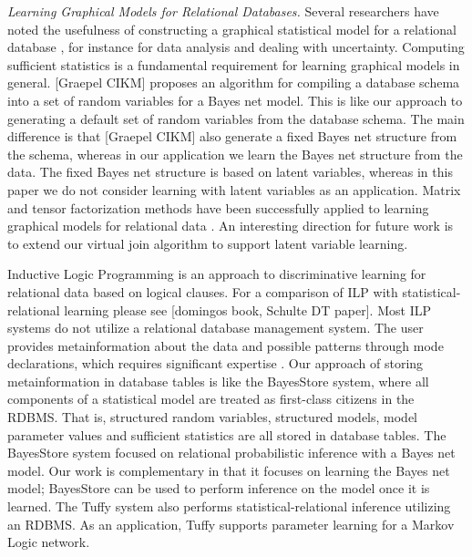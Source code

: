 \documentclass{vldb}
\begin{document}
\emph{Learning Graphical Models for Relational Databases.} Several researchers have noted the usefulness of constructing a graphical statistical model for a relational database \cite{survey-paper,graepel,Bayesstore}, for instance for data analysis and dealing with uncertainty. Computing sufficient statistics is a fundamental requirement for learning graphical models in general. [Graepel CIKM] proposes an algorithm for compiling a database schema into a set of random variables for a Bayes net model. This is like our approach to generating a default set of random variables from the database schema. The main difference is that [Graepel CIKM] also generate a fixed Bayes net structure from the schema, whereas in our application we learn the Bayes net structure from the data. The fixed Bayes net structure is based on latent variables, whereas in this paper we do not consider learning with latent variables as an application. Matrix and tensor factorization methods have been successfully applied to learning graphical models for relational data \cite{faloutsos-turbo}. An interesting direction for future work is to extend our virtual join algorithm to support latent variable learning. 

Inductive Logic Programming is an approach to discriminative learning for relational data based on logical clauses. For a comparison of ILP with statistical-relational learning please see [domingos book, Schulte DT paper]. Most ILP systems do not utilize a relational database management system. The user provides metainformation about the data and possible patterns through mode declarations, which requires significant expertise \cite{natarjan on the setup problem}. Our approach of storing metainformation in database tables is like the BayesStore system, where all components of a statistical model are treated as first-class citizens in the RDBMS. That is, structured random variables, structured models, model parameter values and sufficient statistics are all stored in database tables. The BayesStore system focused on relational probabilistic inference with a Bayes net model. Our work is complementary in that it focuses on learning the Bayes net model; BayesStore can be  used to perform inference on the model once it is learned. The Tuffy system also performs statistical-relational inference utilizing an RDBMS. As an application, Tuffy supports parameter learning for a Markov Logic network.
 
\end{document}
